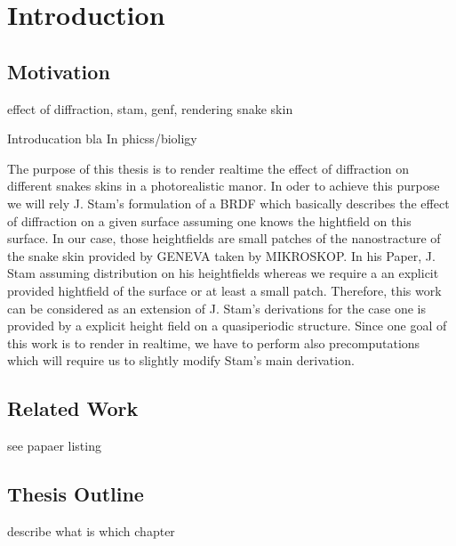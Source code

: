 \section{Introduction}
\subsection{Motivation}
effect of diffraction, stam, genf, rendering snake skin 

Introducation
bla 
In phicss/bioligy

The purpose of this thesis is to render realtime the effect of diffraction on different snakes skins in a photorealistic manor. In oder to achieve this purpose we will rely J. Stam's formulation of a BRDF which basically describes the effect of diffraction on a given surface assuming one knows the hightfield on this surface.
In our case, those heightfields are small patches of the nanostracture of the snake skin provided by GENEVA taken by MIKROSKOP.
In his Paper, J. Stam assuming distribution on his heightfields whereas we require a an explicit provided hightfield of the surface or at least a small patch. Therefore, this work can be considered as an extension of J. Stam's derivations for the case one is provided by a explicit height field on a quasiperiodic structure.
Since one goal of this work is to render in realtime, we have to perform also precomputations which will require us to slightly modify Stam's main derivation.

\subsection{Related Work}
see papaer listing
\subsection{Thesis Outline}
describe what is which chapter

